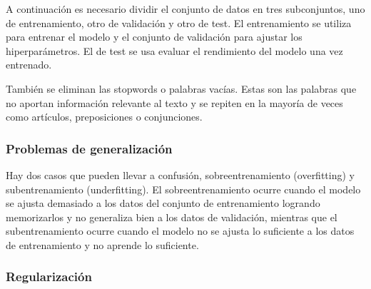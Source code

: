 A continuación es necesario dividir el conjunto de datos en tres subconjuntos, uno de entrenamiento, otro de validación y otro de test.
El entrenamiento se utiliza para entrenar el modelo y el conjunto de validación para ajustar los hiperparámetros. El de test se usa evaluar el rendimiento del modelo una vez entrenado.

También se eliminan las stopwords o palabras vacías. Estas son las palabras que no aportan información relevante al texto y se repiten en la mayoría de veces como artículos, preposiciones o conjunciones.

\subsubsection{Problemas de generalización}

Hay dos casos que pueden llevar a confusión, sobreentrenamiento (overfitting) y subentrenamiento (underfitting).
El sobreentrenamiento ocurre cuando el modelo se ajusta demasiado a los datos del conjunto de entrenamiento logrando memorizarlos y no generaliza bien a los datos de validación, mientras que el subentrenamiento ocurre cuando el modelo no se ajusta lo suficiente a los datos de entrenamiento y no aprende lo suficiente.

\subsubsection{Regularización}

